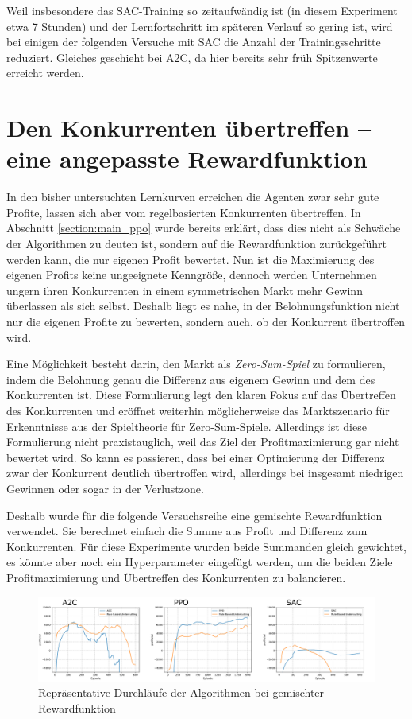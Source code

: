 Weil insbesondere das SAC-Training so zeitaufwändig ist (in diesem Experiment etwa 7 Stunden) und der Lernfortschritt im späteren Verlauf so gering ist, wird bei einigen der folgenden Versuche mit SAC die Anzahl der Trainingsschritte reduziert.
Gleiches geschieht bei A2C, da hier bereits sehr früh Spitzenwerte erreicht werden.

\section{Den Konkurrenten übertreffen -- eine angepasste Rewardfunktion}
\label{section:mixed_reward_function}
In den bisher untersuchten Lernkurven erreichen die Agenten zwar sehr gute Profite, lassen sich aber vom regelbasierten Konkurrenten übertreffen.
In Abschnitt \ref{section:main_ppo} wurde bereits erklärt, dass dies nicht als Schwäche der Algorithmen zu deuten ist, sondern auf die Rewardfunktion zurückgeführt werden kann, die nur eigenen Profit bewertet.
Nun ist die Maximierung des eigenen Profits keine ungeeignete Kenngröße, dennoch werden Unternehmen ungern ihren Konkurrenten in einem symmetrischen Markt mehr Gewinn überlassen als sich selbst.
Deshalb liegt es nahe, in der Belohnungsfunktion nicht nur die eigenen Profite zu bewerten, sondern auch, ob der Konkurrent übertroffen wird.

Eine Möglichkeit besteht darin, den Markt als \textit{Zero-Sum-Spiel} zu formulieren, indem die Belohnung genau die Differenz aus eigenem Gewinn und dem des Konkurrenten ist.
Diese Formulierung legt den klaren Fokus auf das Übertreffen des Konkurrenten und eröffnet weiterhin möglicherweise das Marktszenario für Erkenntnisse aus der Spieltheorie für Zero-Sum-Spiele.
Allerdings ist diese Formulierung nicht praxistauglich, weil das Ziel der Profitmaximierung gar nicht bewertet wird.
So kann es passieren, dass bei einer Optimierung der Differenz zwar der Konkurrent deutlich übertroffen wird, allerdings bei insgesamt niedrigen Gewinnen oder sogar in der Verlustzone.

Deshalb wurde für die folgende Versuchsreihe eine gemischte Rewardfunktion verwendet.
Sie berechnet einfach die Summe aus Profit und Differenz zum Konkurrenten.
Für diese Experimente wurden beide Summanden gleich gewichtet, es könnte aber noch ein Hyperparameter eingefügt werden, um die beiden Ziele Profitmaximierung und Übertreffen des Konkurrenten zu balancieren.

\begin{figure}[htb]
	\centering
	\includegraphics[width=\textwidth]{main/lineplot_mixed_rewards.pdf}
	\caption{Repräsentative Durchläufe der Algorithmen bei gemischter Rewardfunktion}
	\label{graphic:LineplotMixedRewards}
\end{figure}

